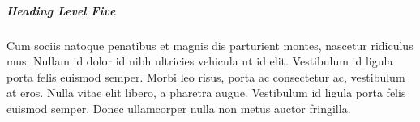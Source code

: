 \documentclass[a4paper,12pt]{article}
\begin{document}
\subparagraph{Heading Level Five}

Cum sociis natoque penatibus et magnis dis parturient montes, nascetur ridiculus mus. Nullam id dolor id nibh ultricies vehicula ut id elit. Vestibulum id ligula porta felis euismod semper. Morbi leo risus, porta ac consectetur ac, vestibulum at eros. Nulla vitae elit libero, a pharetra augue. Vestibulum id ligula porta felis euismod semper. Donec ullamcorper nulla non metus auctor fringilla.
\end{document}
